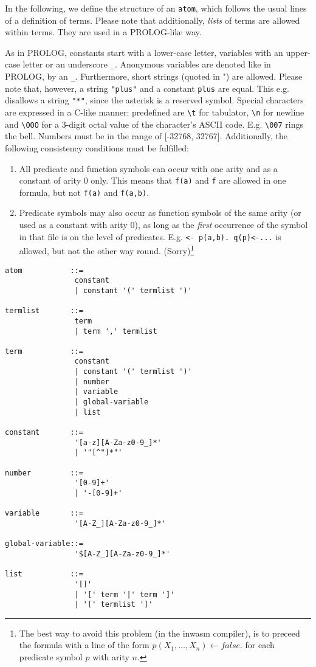 In the following, we define the structure of an {\tt atom}, which
follows the usual lines of a definition of terms. Please note
that additionally, {\em lists\/} of terms are allowed within
terms. They are used in a PROLOG-like way.

As in PROLOG, constants start with a lower-case letter,
variables with an upper-case letter or an underscore {\tt \_}.
Anonymous variables are denoted like in PROLOG, by an {\tt\_}.
Furthermore, short strings (quoted in ") are allowed. Please note
that, however, a string {\tt "plus"} and a constant {\tt plus} are
equal. This e.g. disallows a string {\tt "*"}, since the asterisk is
a reserved symbol.
Special characters are expressed in a C-like manner:
predefined are 
\verb+\t+ for tabulator,
\verb+\n+ for newline and
\verb+\OOO+ for a 3-digit octal value of the character's
ASCII code. E.g. \verb+\007+ rings the bell.
%
Numbers must be in the range of [-32768, 32767].
%
Additionally, the following consistency conditions must be
fulfilled:
\begin{enumerate}
\item
All predicate and function symbols can occur with one arity and
as a constant of arity $0$ only. This means that {\tt f(a)} and
{\tt f} are allowed in one formula, but not {\tt f(a)} and
{\tt f(a,b)}.
\item
Predicate symbols may also occur as function symbols of the
same arity (or used as a constant with arity 0), 
as long as the {\em first} occurrence
of the symbol in that file is on the level of predicates. E.g.
{\tt <- p(a,b). q(p)<-...} is allowed, but not the
other way round. (Sorry)\footnote{
	The best way to avoid this problem (in the inwasm compiler),
	is to preceed the formula with a line of the
	form $p(X_1,\ldots,X_n) \leftarrow false.$ for
	each predicate symbol $p$ with arity $n$.
	}
\end{enumerate}
\begin{verbatim}
atom           ::=
                constant
                | constant '(' termlist ')'

termlist       ::=
                term
                | term ',' termlist

term           ::=
                constant
                | constant '(' termlist ')'
                | number
                | variable
                | global-variable
                | list

constant       ::=
                '[a-z][A-Za-z0-9_]*'
                | '"[^"]*"'

number         ::=
                '[0-9]+'
                | '-[0-9]+'

variable       ::=
                '[A-Z_][A-Za-z0-9_]*'

global-variable::=
                '$[A-Z_][A-Za-z0-9_]*'

list           ::=
                '[]'
                | '[' term '|' term ']'
                | '[' termlist ']'
\end{verbatim}
	

